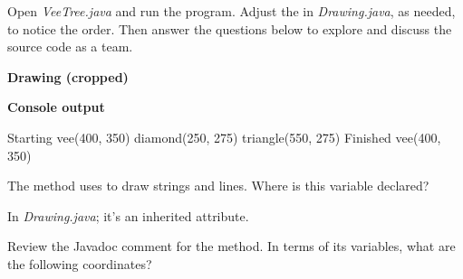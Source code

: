 
Open \textit{VeeTree.java} and run the program.
Adjust the  in \textit{Drawing.java}, as needed, to notice the order.
Then answer the questions below to explore and discuss the source code as a team.

\begin{multicols}{2}

\begin{center}
\textbf{Drawing (cropped)}
\end{center}


\columnbreak

\begin{center}
\textbf{Console output}
\end{center}

\vspace{-1em}

\begin{javalst}
  Starting vee(400, 350)
  diamond(250, 275)
  triangle(550, 275)
  Finished vee(400, 350)
\end{javalst}

\end{multicols}






%


\Q The  method uses  to draw strings and lines.
Where is this variable declared?

\begin{answer}[2em]
In \textit{Drawing.java}; it's an inherited attribute.
\end{answer}


\Q Review the Javadoc comment for the  method.
In terms of its variables, what are the following coordinates?


